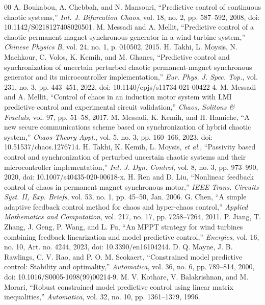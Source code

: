 \documentclass[conference]{IEEEtran}
\begin{document}
\begin{thebibliography}{00}
 A. Boukabou, A. Chebbah, and N. Mansouri, ``Predictive control of continuous chaotic systems,'' \textit{Int. J. Bifurcation Chaos}, vol. 18, no. 2, pp. 587--592, 2008, doi: 10.1142/S0218127408020501.
 M. Messadi and A. Mellit, ``Predictive control of a chaotic permanent magnet synchronous generator in a wind turbine system,'' \textit{Chinese Physics B}, vol. 24, no. 1, p. 010502, 2015.
 H. Takhi, L. Moysis, N. Machkour, C. Volos, K. Kemih, and M. Ghanes, ``Predictive control and synchronization of uncertain perturbed chaotic permanent-magnet synchronous generator and its microcontroller implementation,'' \textit{Eur. Phys. J. Spec. Top.}, vol. 231, no. 3, pp. 443--451, 2022, doi: 10.1140/epjs/s11734-021-00422-4.
 M. Messadi and A. Mellit, ``Control of chaos in an induction motor system with LMI predictive control and experimental circuit validation,'' \textit{Chaos, Solitons \& Fractals}, vol. 97, pp. 51--58, 2017.
 M. Messadi, K. Kemih, and H. Hamiche, ``A new secure communications scheme based on synchronization of hybrid chaotic system,'' \textit{Chaos Theory Appl.}, vol. 5, no. 3, pp. 160--166, 2023, doi: 10.51537/chaos.1276714.
 H. Takhi, K. Kemih, L. Moysis, \textit{et al.}, ``Passivity based control and synchronization of perturbed uncertain chaotic systems and their microcontroller implementation,'' \textit{Int. J. Dyn. Control}, vol. 8, no. 3, pp. 973--990, 2020, doi: 10.1007/s40435-020-00618-x.
 H. Ren and D. Liu, ``Nonlinear feedback control of chaos in permanent magnet synchronous motor,'' \textit{IEEE Trans. Circuits Syst. II, Exp. Briefs}, vol. 53, no. 1, pp. 45--50, Jan. 2006.
 G. Chen, ``A simple adaptive feedback control method for chaos and hyper-chaos control,'' \textit{Applied Mathematics and Computation}, vol. 217, no. 17, pp. 7258--7264, 2011.
 P. Jiang, T. Zhang, J. Geng, P. Wang, and L. Fu, ``An MPPT strategy for wind turbines combining feedback linearization and model predictive control,'' \textit{Energies}, vol. 16, no. 10, Art. no. 4244, 2023, doi: 10.3390/en16104244.
 D. Q. Mayne, J. B. Rawlings, C. V. Rao, and P. O. M. Scokaert, ``Constrained model predictive control: Stability and optimality,'' \textit{Automatica}, vol. 36, no. 6, pp. 789--814, 2000, doi: 10.1016/S0005-1098(99)00214-9.
 M. V. Kothare, V. Balakrishnan, and M. Morari, ``Robust constrained model predictive control using linear matrix inequalities,'' \textit{Automatica}, vol. 32, no. 10, pp. 1361--1379, 1996.
\end{thebibliography}
\end{document}
